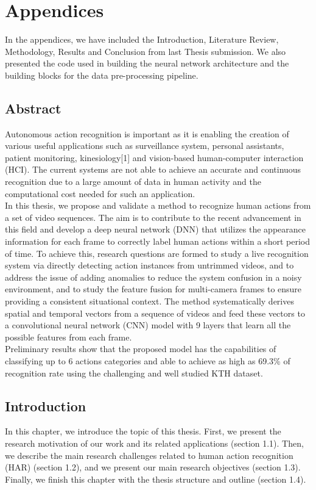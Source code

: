 \chapter{Appendices}
In the appendices, we have included the Introduction, Literature Review, Methodology, Results and Conclusion from last Thesis submission. We also presented the code used in building the neural network architecture and the building blocks for the data pre-processing pipeline.


\section{Abstract}
\hspace{5mm} Autonomous action recognition is important as it is enabling the creation of various useful applications such as surveillance system, personal assistants, patient monitoring, kinesiology[1] and vision-based human-computer interaction (HCI). The current systems are not able to achieve an accurate and continuous recognition due to a large amount of data in human activity and the computational cost needed for such an application.\\

In this thesis, we propose and validate a method to recognize human actions from a set of video sequences. The aim is to contribute to the recent advancement in this field and develop a deep neural network (DNN) that utilizes the appearance information for each frame to correctly label human actions within a short period of time. To achieve this, research questions are formed to study a live recognition system via directly detecting action instances from untrimmed videos, and to address the issue of adding anomalies to reduce the system confusion in a noisy environment, and to study the feature fusion for multi-camera frames to ensure providing a consistent situational context. The method systematically derives spatial and temporal vectors from a sequence of videos and feed these vectors to a convolutional neural network (CNN) model with 9 layers that learn all the possible features from each frame.\\

Preliminary results show that the proposed model has the capabilities of classifying up to 6 actions categories and able to achieve as high as 69.3\% of recognition rate using the challenging and well studied KTH dataset.


\section{Introduction} %
In this chapter, we introduce the topic of this thesis. First, we present the research motivation of our work and its related applications (section 1.1). Then, we describe the main research challenges related to human action recognition (HAR) (section 1.2), and we present our main research objectives (section 1.3). Finally, we finish this chapter with the thesis structure and outline (section 1.4).
\label{Chapter1} %


